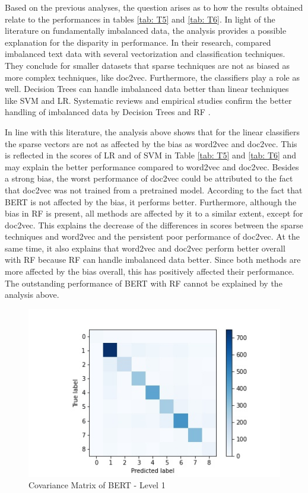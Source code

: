\documentclass[12pt, a4paper, titlepage]{article}
\begin{document}
Based on the previous analyses, the question arises as to how the results obtained relate to the performances in tables \ref{tab: T5} and \ref{tab: T6}. In light of the literature on fundamentally imbalanced data, the analysis provides a possible explanation for the disparity in performance. In their research, \citet{padurariu2019} compared imbalanced text data with several vectorization and classification techniques. They conclude for smaller datasets that sparse techniques are not as biased as more complex techniques, like doc2vec. Furthermore, the classifiers play a role as well. Decision Trees can handle imbalanced data better than linear techniques like \ac{SVM} and \ac{LR}. Systematic reviews and empirical studies confirm the better handling of imbalanced data by Decision Trees and \ac{RF} \citep{kaur2019, muchlinski2016, krawczyk2016}. 

In line with this literature, the analysis above shows that for the linear classifiers the sparse vectors are not as affected by the bias as word2vec and doc2vec. This is reflected in the scores of \ac{LR} and of \ac{SVM} in Table \ref{tab: T5} and \ref{tab: T6} and may explain the better performance compared to word2vec and doc2vec. Besides a strong bias, the worst performance of doc2vec could be attributed to the fact that doc2vec was not trained from a pretrained model. According to the fact that \ac{BERT} is not affected by the bias, it performs better. Furthermore, although the bias in \ac{RF} is present, all methods are affected by it to a similar extent, except for doc2vec. This explains the decrease of the differences in scores between the sparse techniques and word2vec and the persistent poor performance of doc2vec. At the same time, it also explains that word2vec and doc2vec perform better overall with \ac{RF} because \ac{RF} can handle imbalanced data better. Since both methods are more affected by the bias overall, this has positively affected their performance. The outstanding performance of \ac{BERT} with \ac{RF} cannot be explained by the analysis above.

\begin{figure}[]
  \center
  \includegraphics[scale=0.5]{cm_bert_clf_l1.jpg}
  \caption{\label{fig: F25} Covariance Matrix of BERT - Level 1}
\end{figure}
\end{document}
